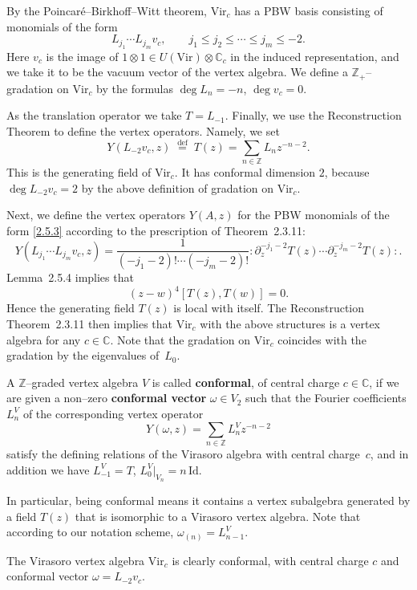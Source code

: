\documentclass[12pt]{article}
\begin{document}
By the Poincaré--Birkhoff--Witt theorem, $\mathrm{Vir}_c$ has a PBW basis
consisting of monomials of the form
\begin{equation}\label{2.5.3}
L_{j_1}\cdots L_{j_m}v_c, \qquad j_1\le j_2\le\cdots\le j_m\le -2.
\end{equation}
Here $v_c$ is the image of $1\otimes1\in U(\mathrm{Vir})\otimes\mathbb{C}_c$
in the induced representation, and we take it to be the vacuum vector of
the vertex algebra.
We define a $\mathbb{Z}_+$--gradation on $\mathrm{Vir}_c$ by the formulas
$\deg L_n = -n$, $\deg v_c = 0$.

As the translation operator we take $T=L_{-1}$.
Finally, we use the Reconstruction Theorem to define the vertex operators.
Namely, we set
\[
Y(L_{-2}v_c,z) \; \overset{\mathrm{def}}{=}\; T(z)
= \sum_{n\in\mathbb{Z}} L_n z^{-n-2}.
\]
This is the generating field of $\mathrm{Vir}_c$.
It has conformal dimension $2$, because $\deg L_{-2}v_c=2$
by the above definition of gradation on $\mathrm{Vir}_c$.

Next, we define the vertex operators $Y(A,z)$ for the PBW monomials
of the form \eqref{2.5.3} according to the prescription of
Theorem~2.3.11:
\[
Y(L_{j_1}\cdots L_{j_m}v_c,z)
= \frac{1}{(-j_1-2)!\cdots(-j_m-2)!}
:\partial_z^{-j_1-2}T(z)\cdots \partial_z^{-j_m-2}T(z):.
\]
Lemma~2.5.4 implies that
\[
(z-w)^4 [T(z),T(w)] = 0.
\]
Hence the generating field $T(z)$ is local with itself.
The Reconstruction Theorem~2.3.11 then implies that
$\mathrm{Vir}_c$ with the above structures is a vertex algebra
for any $c\in\mathbb{C}$.
Note that the gradation on $\mathrm{Vir}_c$ coincides with the gradation
by the eigenvalues of~$L_0$.

\begin{definition}
A $\mathbb{Z}$--graded vertex algebra $V$ is called \textbf{conformal},
of central charge $c\in\mathbb{C}$, if we are given a non--zero
\textbf{conformal vector} $\omega\in V_2$ such that the Fourier coefficients
$L^V_n$ of the corresponding vertex operator
\begin{equation}\label{2.5.4}
Y(\omega,z) = \sum_{n\in\mathbb{Z}} L^V_n z^{-n-2}
\end{equation}
satisfy the defining relations of the Virasoro algebra with central charge~$c$,
and in addition we have $L^V_{-1} = T$, $L^V_0|_{V_n} = n\,\mathrm{Id}$.
\end{definition}
In particular, being conformal means it contains a vertex subalgebra generated by a field $T(z)$ that is isomorphic to a Virasoro vertex algebra. Note that according to our notation scheme,
$\omega_{(n)} = L^V_{n-1}$.
\begin{example}
The Virasoro vertex algebra $\mathrm{Vir}_c$ is clearly conformal, with
central charge $c$ and conformal vector $\omega = L_{-2}v_c$.
\end{example}
\end{document}
